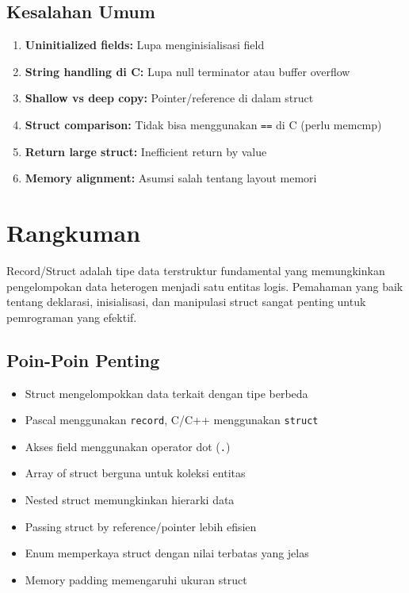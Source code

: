 \documentclass[../main.tex]{subfiles}
\begin{document}
\subsection{Kesalahan Umum}

\begin{enumerate}
  \item \textbf{Uninitialized fields:} Lupa menginisialisasi field
  \item \textbf{String handling di C:} Lupa null terminator atau buffer overflow
  \item \textbf{Shallow vs deep copy:} Pointer/reference di dalam struct
  \item \textbf{Struct comparison:} Tidak bisa menggunakan \texttt{==} di C (perlu memcmp)
  \item \textbf{Return large struct:} Inefficient return by value
  \item \textbf{Memory alignment:} Asumsi salah tentang layout memori
\end{enumerate}

\section{Rangkuman}

Record/Struct adalah tipe data terstruktur fundamental yang memungkinkan pengelompokan data heterogen menjadi satu entitas logis. Pemahaman yang baik tentang deklarasi, inisialisasi, dan manipulasi struct sangat penting untuk pemrograman yang efektif.

\subsection{Poin-Poin Penting}

\begin{itemize}
  \item Struct mengelompokkan data terkait dengan tipe berbeda
  \item Pascal menggunakan \texttt{record}, C/C++ menggunakan \texttt{struct}
  \item Akses field menggunakan operator dot (\texttt{.})
  \item Array of struct berguna untuk koleksi entitas
  \item Nested struct memungkinkan hierarki data
  \item Passing struct by reference/pointer lebih efisien
  \item Enum memperkaya struct dengan nilai terbatas yang jelas
  \item Memory padding memengaruhi ukuran struct
\end{itemize}
\end{document}
